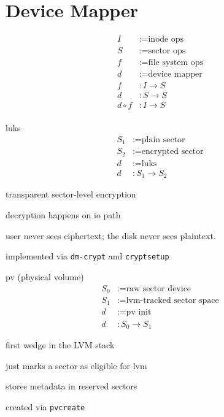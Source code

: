 \documentclass[openany, 12pt]{book}
\begin{document}
\chapter{Device Mapper}
\begin{align*}
	I         & := \text{inode ops}       \\
	S         & := \text{sector ops}      \\
	f         & := \text{file system ops} \\
	d         & := \text{device mapper}   \\
	f         & :  I \to S                \\
	d         & :  S \to S                \\
	d \circ f & : I \to S                 \\
\end{align*}

\begin{definition}{luks}{}
	\begin{align*}
		S_1 & := \text{plain sector}     \\
		S_2 & := \text{encrypted sector} \\
		d   & := \text{luks}             \\
		d   & : S_1 \to S_2
	\end{align*}
	\begin{alist}
		\item transparent sector-level encryption
		\item decryption happens on io path
		\item user never sees ciphertext; the disk never sees plaintext.
		\item implemented via \texttt{dm-crypt} and \texttt{cryptsetup}
	\end{alist}
\end{definition}

\begin{definition}{pv (physical volume)}{}
	\begin{align*}
		S_0 & := \text{raw sector device}        \\
		S_1 & := \text{lvm-tracked sector space} \\
		d   & := \text{pv init}                  \\
		d   & : S_0 \to S_1
	\end{align*}
	\begin{alist}
		\item first wedge in the LVM stack
		\item just marks a sector as eligible for lvm
		\item stores metadata in reserved sectors
		\item created via \texttt{pvcreate}
	\end{alist}
\end{definition}
\end{document}
